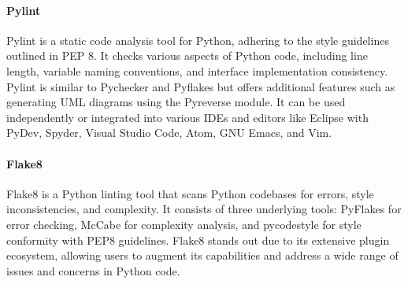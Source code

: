 \paragraph{Pylint}
\label{par:Pylint}
Pylint is a static code analysis tool for Python, adhering to the style guidelines outlined in PEP 8. It checks various aspects of Python code, including line length, variable naming conventions, and interface implementation consistency. Pylint is similar to Pychecker and Pyflakes but offers additional features such as generating UML diagrams using the Pyreverse module. It can be used independently or integrated into various IDEs and editors like Eclipse with PyDev, Spyder, Visual Studio Code, Atom, GNU Emacs, and Vim\cite{Wikipedia:Pylint}.

\paragraph{Flake8}
\label{Par:Flake8}
Flake8 is a Python linting tool that scans Python codebases for errors, style inconsistencies, and complexity. It consists of three underlying tools: PyFlakes for error checking, McCabe for complexity analysis, and pycodestyle for style conformity with PEP8 guidelines. Flake8 stands out due to its extensive plugin ecosystem, allowing users to augment its capabilities and address a wide range of issues and concerns in Python code\cite{flake8}.


